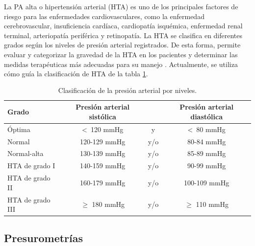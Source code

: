 \filbreak
La PA alta o hipertensión arterial (HTA) es uno de los principales factores de riesgo para las enfermedades 
cardiovasculares, como la enfermedad cerebrovascular, insuficiencia cardíaca, cardiopatía isquémica, 
enfermedad renal terminal, arteriopatía periférica y retinopatía. 
La HTA se clasifica en diferentes grados según los niveles de presión arterial registrados. 
De esta forma, permite evaluar y categorizar la gravedad de la HTA en los pacientes y determinar las medidas 
terapéuticas más adecuadas para su manejo \citep{CITE:6} \citep{CITE:7}. 
Actualmente, se utiliza cómo guía la clasificación de HTA de la tabla \ref{tab:TablaHTA}.

\begin{table}[h]
	\centering
	\caption[Clasificación de la presión arterial por niveles]{Clasificación de la presión arterial por niveles\protect\footnotemark.}
	\begin{tabular}{l c c c}    
		\toprule
		\textbf{Grado} 	      & \textbf{Presión arterial sistólica} 	& \textbf{}	& \textbf{Presión arterial diastólica}  \\
		\midrule
		Óptima                & <\ 120 mmHg                           & 	y			  & <\ 80 mmHg \\		
    Normal                & 120-129 mmHg                          &  	y/o			& 80-84 mmHg \\	
    Normal-alta           & 130-139 mmHg                          & 	y/o			& 85-89 mmHg \\	
    HTA de grado I        & 140-159 mmHg                          & 	y/o			& 90-99 mmHg \\
    HTA de grado II       & 160-179 mmHg                          & 	y/o			& 100-109 mmHg \\		
    HTA de grado III      & $\geq$  180 mmHg                      & 	y/o			& $\geq$  110 mmHg \\	
		\bottomrule
		\hline
	\end{tabular}
	\label{tab:TablaHTA}
\end{table}


\subsection{Presurometrías}

